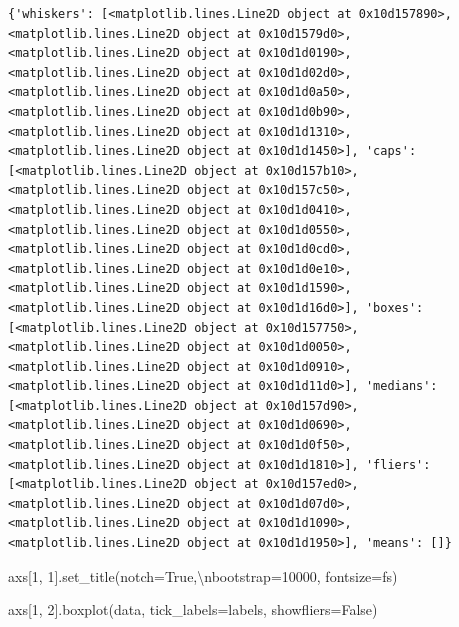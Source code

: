 \documentclass[
  letterpaper,
  DIV=11,
  numbers=noendperiod]{scrreprt}
\newenvironment{Shaded}{\begin{snugshade}}{\end{snugshade}}
\newcommand{\CharTok}[1]{\textcolor[rgb]{0.13,0.47,0.30}{#1}}
\newcommand{\DecValTok}[1]{\textcolor[rgb]{0.68,0.00,0.00}{#1}}
\newcommand{\NormalTok}[1]{\textcolor[rgb]{0.00,0.23,0.31}{#1}}
\newcommand{\OperatorTok}[1]{\textcolor[rgb]{0.37,0.37,0.37}{#1}}
\newcommand{\StringTok}[1]{\textcolor[rgb]{0.13,0.47,0.30}{#1}}
\newcommand{\VariableTok}[1]{\textcolor[rgb]{0.07,0.07,0.07}{#1}}
\begin{document}
\begin{verbatim}
{'whiskers': [<matplotlib.lines.Line2D object at 0x10d157890>, <matplotlib.lines.Line2D object at 0x10d1579d0>, <matplotlib.lines.Line2D object at 0x10d1d0190>, <matplotlib.lines.Line2D object at 0x10d1d02d0>, <matplotlib.lines.Line2D object at 0x10d1d0a50>, <matplotlib.lines.Line2D object at 0x10d1d0b90>, <matplotlib.lines.Line2D object at 0x10d1d1310>, <matplotlib.lines.Line2D object at 0x10d1d1450>], 'caps': [<matplotlib.lines.Line2D object at 0x10d157b10>, <matplotlib.lines.Line2D object at 0x10d157c50>, <matplotlib.lines.Line2D object at 0x10d1d0410>, <matplotlib.lines.Line2D object at 0x10d1d0550>, <matplotlib.lines.Line2D object at 0x10d1d0cd0>, <matplotlib.lines.Line2D object at 0x10d1d0e10>, <matplotlib.lines.Line2D object at 0x10d1d1590>, <matplotlib.lines.Line2D object at 0x10d1d16d0>], 'boxes': [<matplotlib.lines.Line2D object at 0x10d157750>, <matplotlib.lines.Line2D object at 0x10d1d0050>, <matplotlib.lines.Line2D object at 0x10d1d0910>, <matplotlib.lines.Line2D object at 0x10d1d11d0>], 'medians': [<matplotlib.lines.Line2D object at 0x10d157d90>, <matplotlib.lines.Line2D object at 0x10d1d0690>, <matplotlib.lines.Line2D object at 0x10d1d0f50>, <matplotlib.lines.Line2D object at 0x10d1d1810>], 'fliers': [<matplotlib.lines.Line2D object at 0x10d157ed0>, <matplotlib.lines.Line2D object at 0x10d1d07d0>, <matplotlib.lines.Line2D object at 0x10d1d1090>, <matplotlib.lines.Line2D object at 0x10d1d1950>], 'means': []}
\end{verbatim}

\begin{Shaded}
\begin{Highlighting}[]
\NormalTok{axs[}\DecValTok{1}\NormalTok{, }\DecValTok{1}\NormalTok{].set\_title(}\StringTok{\textquotesingle{}notch=True,}\CharTok{\textbackslash{}n}\StringTok{bootstrap=10000\textquotesingle{}}\NormalTok{, fontsize}\OperatorTok{=}\NormalTok{fs)}

\NormalTok{axs[}\DecValTok{1}\NormalTok{, }\DecValTok{2}\NormalTok{].boxplot(data, tick\_labels}\OperatorTok{=}\NormalTok{labels, showfliers}\OperatorTok{=}\VariableTok{False}\NormalTok{)}
\end{Highlighting}
\end{Shaded}
\end{document}
